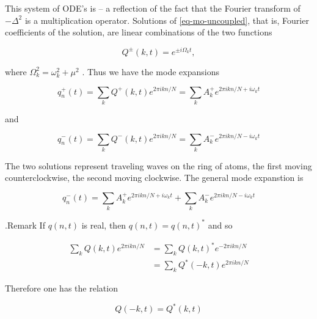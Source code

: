 This  system  of  ODE's  is    --  a  reflection  of  the  fact  that  the  Fourier  transform  of   $-\Delta^2$  is  a  multiplication  operator.   Solutions  of   \eqref{eq-mo-uncoupled},  that  is,  Fourier  coefficients  of  the  solution,  are  linear  combinations  of  the  two  functions



\begin{equation}
Q^\pm(k,t) = e^{\pm i\Omega_kt},
\end{equation}


where   $\Omega_k^2 = \omega_k^2 + \mu^2$ .   Thus  we  have  the  mode  expansions



\begin{equation}
q_n^+ (t) =  \sum_k Q^+ (k,t) e^{2\pi i kn/N}
= \sum_k A_k^+ e^{2\pi i kn/N + i\omega_k t }
\end{equation}


and



\begin{equation}
q_n^-(t) =  \sum_k Q^- (k,t) e^{2\pi i kn/N}  =
 \sum_k A_k^- e^{2\pi i kn/N - i\omega_k t }
\end{equation}


The  two  solutions  represent  traveling  waves  on  the  ring  of  atoms,  the  first  moving  counterclockwise,  the  second  moving  clockwise.   The  general  mode  expanstion  is



\begin{equation}
q_n^-(t)   =
 \sum_k A_k^+ e^{2\pi i kn/N + i\omega_k t }
 + \sum_k A_k^- e^{2\pi i kn/N - i\omega_k t }
\end{equation}


.Remark
 If   $q(n,t)$  is  real,  then   $q(n,t) =q(n,t)^*$  and  so



\begin{align}
\sum_k Q(k,t) e^{2\pi i kn/N } &=  \sum_k  Q(k,t)^* e^{-2\pi i kn/N } \\
 &=  \sum_k Q^*(-k, t) e^{2\pi i kn/N }
\end{align}


Therefore  one  has  the  relation



\begin{equation}
Q(-k,t) = Q^*(k,t)
\end{equation}


